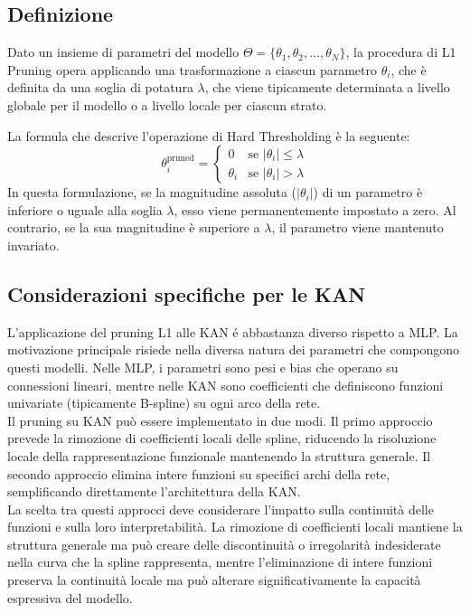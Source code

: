 \documentclass[a4paper,12pt]{report}
\begin{document}
	\subsection{Definizione}
	Dato un insieme di parametri del modello $\Theta = \{\theta_1, \theta_2, \dots, \theta_N\}$, la procedura di L1 Pruning opera applicando una trasformazione a ciascun parametro $\theta_i$, che è definita da una soglia di potatura $\lambda$, che viene tipicamente determinata a livello globale per il modello o a livello locale per ciascun strato.
	
	La formula che descrive l'operazione di Hard Thresholding è la seguente:
	$$
	\theta_i^{\text{pruned}} = \begin{cases}
		0 & \text{se } |\theta_i| \le \lambda \\
		\theta_i & \text{se } |\theta_i| > \lambda
	\end{cases}
	$$
	In questa formulazione, se la magnitudine assoluta ($|\theta_i|$) di un parametro è inferiore o uguale alla soglia $\lambda$, esso viene permanentemente impostato a zero. Al contrario, se la sua magnitudine è superiore a $\lambda$, il parametro viene mantenuto invariato.
	
	\subsection{Considerazioni specifiche per le KAN}
	L'applicazione del pruning L1 alle KAN é abbastanza diverso rispetto a MLP. La motivazione principale risiede nella diversa natura dei parametri che compongono questi modelli. Nelle MLP, i parametri sono pesi e bias che operano su connessioni lineari, mentre nelle KAN sono coefficienti che definiscono funzioni univariate (tipicamente B-spline) su ogni arco della rete. \\
	Il pruning su KAN può essere implementato in due modi. Il primo approccio prevede la rimozione di coefficienti locali delle spline, riducendo la risoluzione locale della rappresentazione funzionale mantenendo la struttura generale. Il secondo approccio elimina intere funzioni su specifici archi della rete, semplificando direttamente l'architettura della KAN. \\
	La scelta tra questi approcci deve considerare l'impatto sulla continuità delle funzioni e sulla loro interpretabilità. La rimozione di coefficienti locali mantiene la struttura generale ma può creare delle discontinuità o irregolarità indesiderate nella curva che la spline rappresenta, mentre l'eliminazione di intere funzioni preserva la continuità locale ma può alterare significativamente la capacità espressiva del modello.
	
\end{document}
